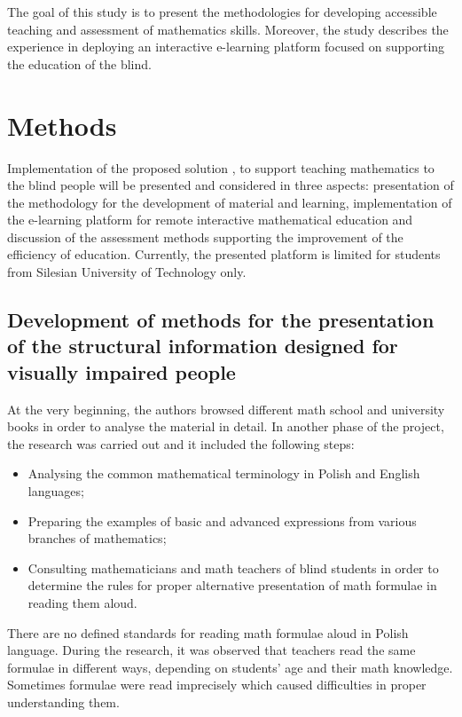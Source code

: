 \documentclass[12pt,1p]{elsarticle}
\begin{document}
	The goal of this study is to present the methodologies for developing accessible teaching and assessment of mathematics skills. Moreover, the study describes the experience in deploying an interactive e-learning platform focused on supporting the education of the blind.



\section{Methods}

	Implementation of the proposed solution \cite{Brzoza:2012, Brzoza:2014}, to support teaching mathematics to the blind people will be presented and considered in three aspects: presentation of the methodology for the development of material and learning, implementation of the e-learning platform for remote interactive mathematical education and discussion of the assessment methods supporting the improvement of the efficiency of education. Currently, the presented platform is limited for students from Silesian University of Technology only.

\subsection{Development of methods for the presentation of the structural information designed for visually impaired people}

	At the very beginning, the authors browsed different math school and university books in order to analyse the material in detail. In another phase of the project, the research was carried out and it included the following steps:

\begin{itemize}
    \item Analysing the common mathematical terminology in Polish and English languages;
    \item Preparing the examples of basic and advanced expressions from various branches of mathematics;
    \item Consulting mathematicians and math teachers of blind students in order to determine the rules for proper alternative presentation of math formulae in reading them aloud.
\end{itemize}
	
	There are no defined standards for reading math formulae aloud in Polish language. During the research, it was observed that teachers read the same formulae in different ways, depending on students' age and their math knowledge. Sometimes formulae were read imprecisely which caused difficulties in proper understanding them.
	
\end{document}
